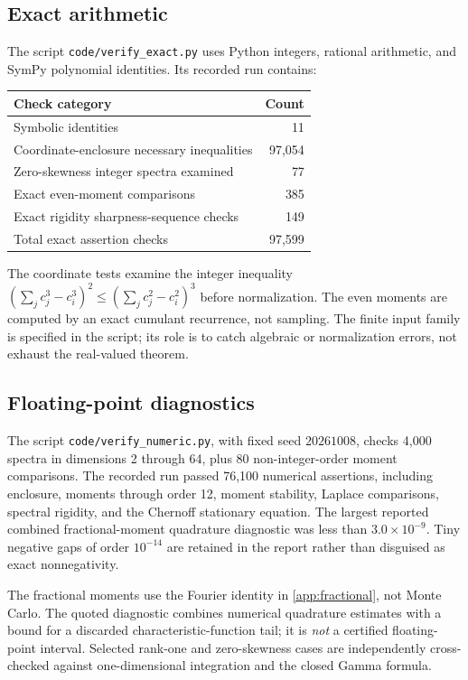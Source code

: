 \documentclass[11pt]{article}
\numberwithin{equation}{section}
\theoremstyle{definition}
\theoremstyle{remark}
\begin{document}
\subsection{Exact arithmetic}
The script \texttt{code/verify\_exact.py} uses Python integers, rational arithmetic, and SymPy polynomial identities. Its recorded run contains:
\begin{center}
\begin{tabular}{@{}lr@{}}
\toprule
Check category & Count\\
\midrule
Symbolic identities & 11\\
Coordinate-enclosure necessary inequalities & 97,054\\
Zero-skewness integer spectra examined & 77\\
Exact even-moment comparisons & 385\\
Exact rigidity sharpness-sequence checks & 149\\
\midrule
Total exact assertion checks & 97,599\\
\bottomrule
\end{tabular}
\end{center}
The coordinate tests examine the integer inequality
$(\sum_j c_j^3-c_i^3)^2\leq(\sum_jc_j^2-c_i^2)^3$ before normalization. The even moments are computed by an exact cumulant recurrence, not sampling. The finite input family is specified in the script; its role is to catch algebraic or normalization errors, not exhaust the real-valued theorem.

\subsection{Floating-point diagnostics}
The script \texttt{code/verify\_numeric.py}, with fixed seed $20261008$, checks 4,000 spectra in dimensions 2 through 64, plus 80 non-integer-order moment comparisons. The recorded run passed 76,100 numerical assertions, including enclosure, moments through order 12, moment stability, Laplace comparisons, spectral rigidity, and the Chernoff stationary equation. The largest reported combined fractional-moment quadrature diagnostic was less than $3.0\times10^{-9}$. Tiny negative gaps of order $10^{-14}$ are retained in the report rather than disguised as exact nonnegativity.

The fractional moments use the Fourier identity in \cref{app:fractional}, not Monte Carlo. The quoted diagnostic combines numerical quadrature estimates with a bound for a discarded characteristic-function tail; it is \emph{not} a certified floating-point interval. Selected rank-one and zero-skewness cases are independently cross-checked against one-dimensional integration and the closed Gamma formula.
\end{document}
